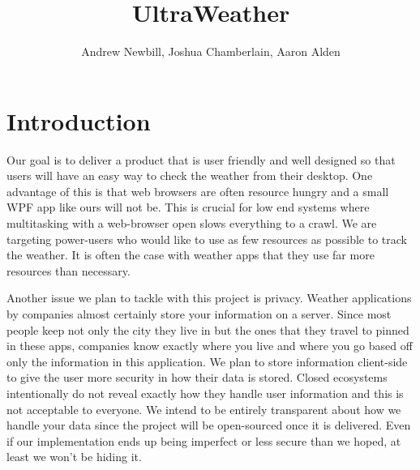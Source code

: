 \documentclass[10pt,conference,onecolumn,compsoc]{IEEEtran}
\begin{document}
\title{UltraWeather}
%
%


\author{Andrew Newbill, Joshua Chamberlain, Aaron Alden\\ %
}



\maketitle



\IEEEdisplaynontitleabstractindextext

\IEEEpeerreviewmaketitle



\section{Introduction}
\quad Our goal is to deliver a product that is user friendly and well designed so that users will have an easy way to check the weather from their desktop. One advantage of this is that web browsers are often resource hungry and a small WPF app like ours will not be. This is crucial for low end systems where multitasking with a web-browser open slows everything to a crawl. We are targeting power-users who would like to use as few resources as possible to track the weather. It is often the case with weather apps that they use far more resources than necessary.

\quad Another issue we plan to tackle with this project is privacy. Weather applications by companies almost certainly store your information on a server. Since most people keep not only the city they live in but the ones that they travel to pinned in these apps, companies know exactly where you live and where you go based off only  the information in this application. We plan to store information client-side to give the user more security in how their data is stored. Closed ecosystems  intentionally do not reveal exactly how they handle user information and this is not acceptable to everyone. We intend to be entirely transparent about how we handle your data since the project will be open-sourced once it is delivered. Even if our implementation ends up being imperfect or less secure than we hoped, at least we won't be hiding it.
\end{document}
